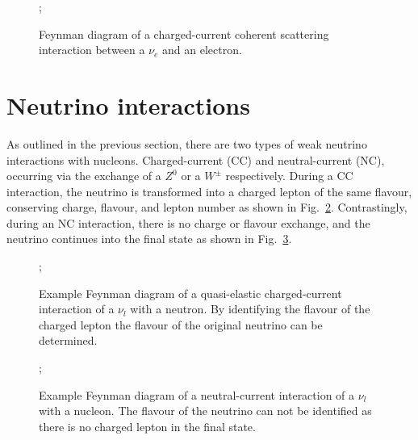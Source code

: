 \begin{figure} %
    ;
    \caption[$\nu_{e}$ coherent scattering Feynman diagram]
    {Feynman diagram of a charged-current coherent scattering interaction between a $\nu_{e}$ and
        an electron.}
    \label{fig:coherent_scattering}
\end{figure}

\section{Neutrino interactions} %
\label{sec:theory_interactions} %

As outlined in the previous section, there are two types of weak neutrino interactions with
nucleons. Charged-current (CC) and neutral-current (NC), occurring via the exchange of a $Z^{0}$
or a $W^{\pm}$ respectively. During a CC interaction, the neutrino is transformed into a charged
lepton of the same flavour, conserving charge, flavour, and lepton number as shown in
Fig.~\ref{fig:cc_interaction}. Contrastingly, during an NC interaction, there is no charge or
flavour exchange, and the neutrino continues into the final state as shown in
Fig.~\ref{fig:nc_interaction}.

\begin{figure} %
    ;
    \caption[Feynman diagram of a charged-current interaction]
    {Example Feynman diagram of a quasi-elastic charged-current interaction of a $\nu_{l}$ with a
        neutron. By identifying the flavour of the charged lepton the flavour of the original
        neutrino can be determined.}
    \label{fig:cc_interaction}
\end{figure}

\begin{figure} %
    ;
    \caption[Feynman diagram of a neutral-current interaction]
    {Example Feynman diagram of a neutral-current interaction of a $\nu_{l}$ with a nucleon. The
        flavour of the neutrino can not be identified as there is no charged lepton in the final
        state.}
    \label{fig:nc_interaction}
\end{figure}

